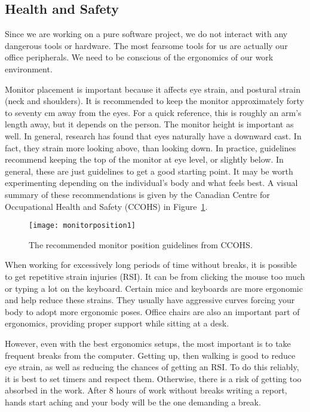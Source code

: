 \subsection{Health and Safety}\label{subsec:healthnsafety}

Since we are working on a pure software project,
we do not interact with any dangerous tools or hardware.
The most fearsome tools for us are actually our office peripherals.
We need to be conscious of the ergonomics of our work environment.


Monitor placement is important because it affects eye strain, and postural strain (neck and shoulders).
It is recommended to keep the monitor approximately forty to seventy cm away from the eyes.
For a quick reference, this is roughly an arm's length away, but it depends on the person.
The monitor height is important as well.
In general, research has found that eyes naturally have a downward cast. %
In fact, they strain more looking above, than looking down.
In practice, guidelines recommend keeping the top of the monitor at eye level, or slightly below.
In general, these are just guidelines to get a good starting point.
It may be worth experimenting depending on the individual's body and what feels best.
A visual summary of these recommendations is given by the Canadian Centre for Occupational Health and Safety (CCOHS) in Figure~\ref{fig:monitor-pos}. %
\begin{figure}[h]
    \centering
    \texttt{[image: monitorposition1]}
    \caption{The recommended monitor position guidelines from CCOHS.}
    \label{fig:monitor-pos}
\end{figure}

When working for excessively long periods of time without breaks,
it is possible to get repetitive strain injuries (RSI).
It can be from clicking the mouse too much or typing a lot on the keyboard.
Certain mice and keyboards are more ergonomic and help reduce these strains.
They usually have aggressive curves forcing your body to adopt more ergonomic poses.
Office chairs are also an important part of ergonomics, providing proper support while sitting at a desk.

However, even with the best ergonomics setups, the most important is to take frequent breaks from the computer.
Getting up, then walking is good to reduce eye strain, as well as reducing the chances of getting an RSI.
To do this reliably, it is best to set timers and respect them.
Otherwise, there is a risk of getting too absorbed in the work.
After 8 hours of work without breaks writing a report, hands start aching and your body will be the one demanding a break.

